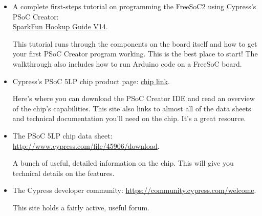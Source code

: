 \documentclass[10pt]{report}
\begin{document}
\begin{appendices}
\begin{itemize}
    \item A complete first-steps tutorial on programming the FreeSoC2 using Cypress's PSoC Creator: \\
    \href{https://learn.sparkfun.com/tutorials/freesoc2-hookup-guide-v14?_ga=2.8215090.1292973380.1530714260-313202448.1431455612}{\underline{SparkFun Hookup Guide V14}}.
    
    This tutorial runs through the components on the board itself and how to get your first PSoC Creator program working. This is the best place to start! The walkthrough also includes how to run Arduino code on a FreeSoC board.
    
    \item Cypress's PSoC 5LP chip product page: \href{http://www.cypress.com/products/32-bit-arm-cortex-m3-psoc-5lp}{\underline{chip link}}.
    
    Here's where you can download the PSoC Creator IDE and read an overview of the chip's capabilities. This site also links to almost all of the data sheets and technical documentation you'll need on the chip. It's a great resource.
    
    \item The PSoC 5LP chip data sheet: \url{http://www.cypress.com/file/45906/download}.
    
    A bunch of useful, detailed information on the chip. This will give you technical details on the features.
    
    \item The Cypress developer community: \url{https://community.cypress.com/welcome}.
    
    This site holds a fairly active, useful forum.
\end{itemize}




\end{appendices}
\end{document}
